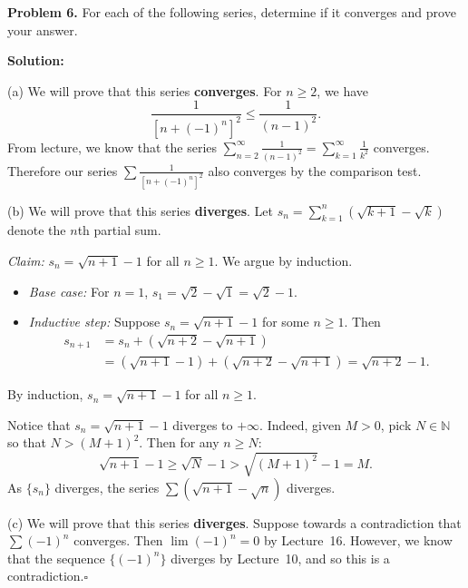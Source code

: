 \documentclass[12pt]{article}
\begin{document}
\begin{tcolorbox}[
  enhanced, breakable,
  colback  = solgreen,
  colframe = green!45!black,
  fonttitle = \bfseries,
  title = {\textsc{Official Solution}\hfill Homework 6 -- Selected Solutions}
]
\textbf{Problem 6.}
For each of the following series, determine if it converges and prove your answer.

\medskip\textbf{Solution:}

\medskip
(a) We will prove that this series \textbf{converges}.
For $n \geq 2$, we have
\[
  \frac{1}{[n+(-1)^n]^2} \leq \frac{1}{(n-1)^2}.
\]
From lecture, we know that the series
$\displaystyle\sum_{n=2}^{\infty} \frac{1}{(n-1)^2} = \sum_{k=1}^{\infty} \frac{1}{k^2}$
converges.
Therefore our series $\sum \frac{1}{[n+(-1)^n]^2}$ also converges by the comparison test.

\medskip
(b) We will prove that this series \textbf{diverges}.
Let $s_n = \sum_{k=1}^{n}(\sqrt{k+1}-\sqrt{k})$ denote the $n$th partial sum.

\textit{Claim:} $s_n = \sqrt{n+1}-1$ for all $n \geq 1$.
We argue by induction.
\begin{itemize}[nosep, leftmargin=1.5em]
  \item \textit{Base case:} For $n=1$, $s_1 = \sqrt{2}-\sqrt{1} = \sqrt{2}-1$. \checkmark
  \item \textit{Inductive step:} Suppose $s_n = \sqrt{n+1}-1$ for some $n \geq 1$. Then
    \begin{align*}
      s_{n+1}
      &= s_n + (\sqrt{n+2}-\sqrt{n+1}) \\
      &= (\sqrt{n+1}-1)+(\sqrt{n+2}-\sqrt{n+1}) = \sqrt{n+2}-1.
    \end{align*}
\end{itemize}
By induction, $s_n = \sqrt{n+1}-1$ for all $n \geq 1$.

Notice that $s_n = \sqrt{n+1}-1$ diverges to $+\infty$.
Indeed, given $M > 0$, pick $N \in \mathbb{N}$ so that $N > (M+1)^2$.
Then for any $n \geq N$:
\[
  \sqrt{n+1}-1 \geq \sqrt{N}-1 > \sqrt{(M+1)^2}-1 = M.
\]
As $\{s_n\}$ diverges, the series $\sum(\sqrt{n+1}-\sqrt{n})$ diverges.

\medskip
(c) We will prove that this series \textbf{diverges}.
Suppose towards a contradiction that $\sum(-1)^n$ converges.
Then $\lim(-1)^n = 0$ by Lecture~16.
However, we know that the sequence $\{(-1)^n\}$ diverges by Lecture~10, and so this
is a contradiction.\hfill$\square$
\end{tcolorbox}

\bigskip
\end{document}
